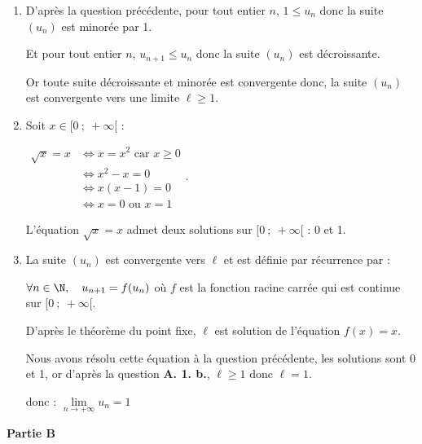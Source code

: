 \begin{enumerate}
\begin{enumerate}
Si, pour $n$ naturel, $P_n$ est vraie, alors $P_{n+1}$ est vraie également.

\emph{Conclusion :} L'affirmation $P_0$ est vraie, et, pour tout entier naturel non nul $n$, la véracité de l'affirmation est héréditaire : d'après le principe de récurrence, on en déduit que pour tout entier naturel non nul $n$, on a : $1 \leqslant u_{n+1} \leqslant u_{n}$.
	\item D'après la question précédente, pour tout entier $n$, $1\leqslant u_n$ donc la suite $\left(u_n\right)$ est minorée par 1.

Et pour tout entier $n$, $u_{n+1}\leqslant u_n$ donc la suite $\left( u_n\right)$ est décroissante.

Or toute suite décroissante et minorée est convergente donc, la suite $\left( u_n\right)$ est convergente vers une limite $\ell \geqslant 1$.
	\item Soit $x \in [0~;~+\infty[$ :

$\begin{aligned}\sqrt{x} =x &\iff x =x^2 \text { car }x\geqslant 0 \\
	&\iff x^2-x=0\\
	& \iff x(x-1)=0\\
	&\iff x=0 \text{ ou } x=1
\end{aligned}$.

L'équation $\sqrt{x}=x$ admet deux solutions sur $[0~;~+\infty[$ : 0 et 1.
	\item La suite $\left(u_{n}\right)$ est convergente vers $\ell$ et est définie par récurrence par :

$\forall n \in \N, \quad u_{n+1}=f(u_n)$ \quad où  $f$ est la fonction racine carrée qui est continue sur $[0~;~+\infty[$.

D'après le théorème du point fixe, $\ell$ est solution de l'équation $f(x) = x$.

Nous avons résolu cette équation à la question précédente, les solutions sont 0 et 1, or d'après la question \textbf{A. 1. b.}, $\ell \geqslant 1$ donc $\ell =1$.

donc : $\lim\limits_{n\to +\infty} u_n = 1$
	\end{enumerate}
\end{enumerate}

\medskip

\textbf{Partie B}

\medskip

